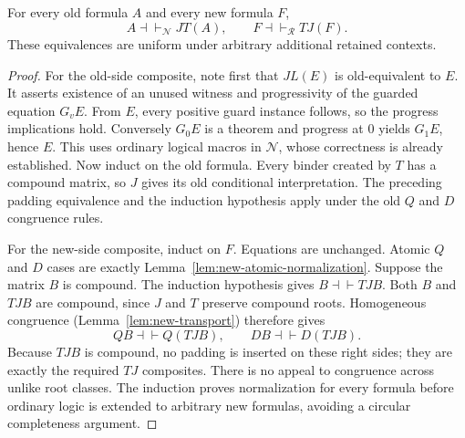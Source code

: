\begin{theorem}
\label{thm:new-roundtrips}
For every old formula $A$ and every new formula $F$,
\begin{equation}
 A\dashv\vdash_{\mathcal N}JT(A),\qquad
 F\dashv\vdash_{\mathcal R}TJ(F).
 \label{eq:new-roundtrips}
\end{equation}
These equivalences are uniform under arbitrary additional retained contexts.
\end{theorem}
\begin{proof}
For the old-side composite, note first that $JL(E)$ is old-equivalent to
$E$.  It asserts existence of an unused witness and progressivity of the
guarded equation $G_vE$.  From $E$, every positive guard instance follows,
so the progress implications hold.  Conversely $G_0E$ is a theorem and
progress at $0$ yields $G_1E$, hence $E$.  This uses ordinary logical
macros in $\mathcal N$, whose correctness is already established.
Now induct on the old formula.  Every binder created by $T$ has a compound
matrix, so $J$ gives its old conditional interpretation.  The preceding
padding equivalence and the induction hypothesis apply under the old
$Q$ and $D$ congruence rules.

For the new-side composite, induct on $F$.  Equations are unchanged.
Atomic $Q$ and $D$ cases are exactly
Lemma~\ref{lem:new-atomic-normalization}.  Suppose the matrix $B$ is
compound.  The induction hypothesis gives $B\dashv\vdash TJB$.
Both $B$ and $TJB$ are compound, since $J$ and $T$ preserve compound roots.
Homogeneous congruence (Lemma~\ref{lem:new-transport}) therefore gives
\[
 Q B\dashv\vdash Q(TJB),\qquad
 D B\dashv\vdash D(TJB).
\]
Because $TJB$ is compound, no padding is inserted on these right sides;
they are exactly the required $TJ$ composites.  There is no appeal to
congruence across unlike root classes.  The induction proves normalization
for every formula before ordinary logic is extended to arbitrary new
formulas, avoiding a circular completeness argument.
\end{proof}

